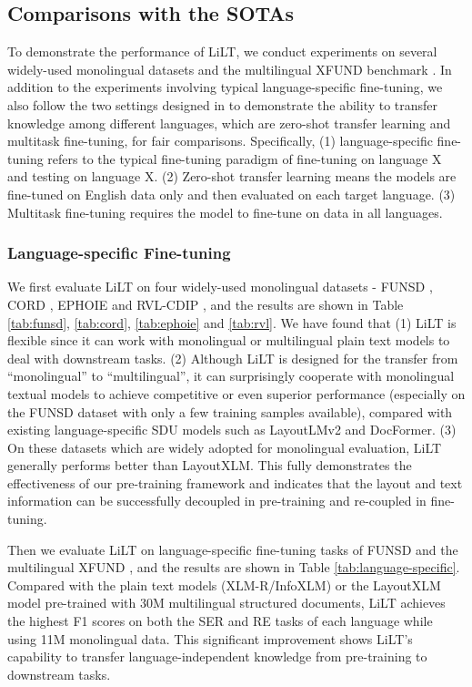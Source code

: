 \documentclass[11pt]{article}
\begin{document}
\subsection{Comparisons with the SOTAs}


To demonstrate the performance of LiLT, we conduct experiments on several widely-used monolingual datasets and the multilingual XFUND benchmark \cite{xu2021layoutxlm}. 
In addition to the experiments involving typical language-specific fine-tuning, 
we also follow the two settings designed in \cite{xu2021layoutxlm} to demonstrate the ability to transfer knowledge among different languages, which are zero-shot transfer learning and multitask fine-tuning, for fair comparisons. Specifically, (1) language-specific fine-tuning refers to the typical fine-tuning paradigm of fine-tuning on language X and testing on language X. (2) Zero-shot transfer learning means the models are fine-tuned on English data only and then evaluated on each target language. (3) Multitask fine-tuning requires the model to fine-tune on data in all languages. 
\subsubsection{Language-specific Fine-tuning}
We first evaluate LiLT on four  widely-used monolingual   datasets - FUNSD \cite{funsd}, CORD \cite{park2019cord}, EPHOIE \cite{vies} and  RVL-CDIP \cite{cdip}, and the results are shown in Table \ref{tab:funsd}, \ref{tab:cord}, \ref{tab:ephoie} and \ref{tab:rvl}.
We have found that (1) LiLT is flexible since it can work with monolingual or multilingual plain text models to deal with downstream tasks. (2) Although LiLT is designed for the transfer from ``monolingual” to ``multilingual”, it can surprisingly cooperate with 
monolingual textual models to achieve competitive or even superior performance (especially on the FUNSD dataset with only a few training samples available), compared with existing language-specific SDU  models such as LayoutLMv2 and DocFormer. (3) On these  datasets which are widely adopted for monolingual evaluation,  LiLT generally performs better than LayoutXLM.
This fully demonstrates the effectiveness of our pre-training framework and indicates that the layout and text information can  be  successfully  decoupled in pre-training and  re-coupled in fine-tuning.



Then we evaluate  LiLT on language-specific fine-tuning tasks of FUNSD and the multilingual XFUND \cite{xu2021layoutxlm}, and the results are shown in Table \ref{tab:language-specific}. Compared with the plain text models (XLM-R/InfoXLM) or the LayoutXLM model pre-trained with 30M multilingual structured documents, LiLT achieves the highest F1 scores on  both the SER and RE tasks of each language while using 11M monolingual data. This significant improvement shows LiLT’s capability to transfer language-independent knowledge from pre-training to downstream tasks.
\end{document}
